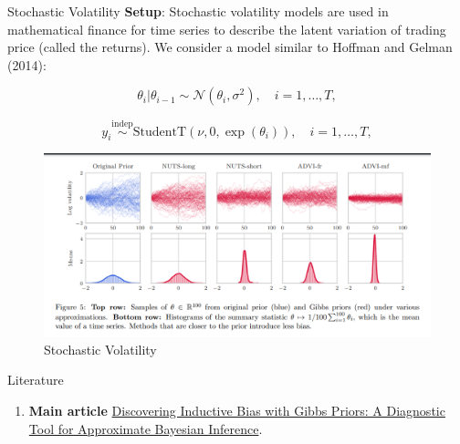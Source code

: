 \documentclass{beamer}
\begin{document}
	\begin{frame}{Stochastic Volatility}
		\textbf{Setup}: Stochastic volatility models are used in mathematical finance for time series to describe the latent variation of trading price (called the returns). We consider a model similar to Hoffman and Gelman (2014):
		
		\[
		\theta_i|\theta_{i-1} \sim \mathcal{N}(\theta_i, \sigma^2), \quad i = 1, \ldots, T,
		\]
		
		\[
		y_i \overset{\text{indep}}{\sim} \text{StudentT}(\nu, 0, \exp(\theta_i)), \quad i = 1, \ldots, T,
		\]
		
		
		\begin{figure}[bhtp]
			\includegraphics[width=0.8\linewidth]{stochastic-volatility.png}
			\caption{Stochastic Volatility}
		\end{figure}
	\end{frame}
	
	
	\begin{frame}{Literature}
		\begin{enumerate}
			\item \textbf{Main article} \href{https://arxiv.org/pdf/2203.03353.pdf}
			{Discovering Inductive Bias with Gibbs Priors: A Diagnostic Tool for Approximate Bayesian Inference}.
		\end{enumerate}
	\end{frame}
	
	
	
\end{document}
